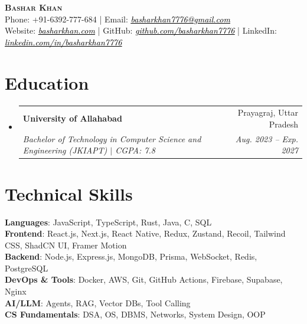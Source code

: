\documentclass[letterpaper,11pt]{article}
\makeatletter
\newcommand{\resumeSubheading}[4]{
  \item
    \begin{tabular*}{0.97\textwidth}[t]{l@{\extracolsep{\fill}}r}
      \textbf{#1} & #2 \\
      \textit{\small#3} & \textit{\small #4} \\
    \end{tabular*}
}
\newcommand{\resumeSubHeadingListStart}{\begin{itemize}[leftmargin=0.15in, label={}, topsep=1pt, itemsep=2pt, parsep=0pt]}
\newcommand{\resumeSubHeadingListEnd}{\end{itemize}}
\makeatother
\begin{document}
\begin{center}
    \textbf{\Huge \scshape Bashar Khan} \\[6pt]
    \small
    Phone: +91-6392-777-684 \enspace|\enspace
    Email: \href{mailto:basharkhan7776@gmail.com}{\textcolor{black}{\textit{\ul{basharkhan7776@gmail.com}}}} \\[2pt]
    Website: \href{https://www.basharkhan.com}{\textcolor{black}{\textit{\ul{basharkhan.com}}}} \enspace|\enspace
    GitHub: \href{https://github.com/basharkhan7776}{\textcolor{black}{\textit{\ul{github.com/basharkhan7776}}}} \enspace|\enspace
    LinkedIn: \href{https://linkedin.com/in/basharkhan7776}{\textcolor{black}{\textit{\ul{linkedin.com/in/basharkhan7776}}}}
\end{center}
\vspace{-8pt}


\section{Education}
  \resumeSubHeadingListStart
    \resumeSubheading
      {University of Allahabad}{Prayagraj, Uttar Pradesh}
      {Bachelor of Technology in Computer Science and Engineering (JKIAPT) $|$ CGPA: 7.8}{Aug. 2023 -- Exp. 2027}
  \resumeSubHeadingListEnd


\section{Technical Skills}
 \begin{itemize}[leftmargin=0.15in, label={}, topsep=1pt]
    \small{\item{
     \textbf{Languages}{: JavaScript, TypeScript, Rust, Java, C, SQL} \\
     \textbf{Frontend}{: React.js, Next.js, React Native, Redux, Zustand, Recoil, Tailwind CSS, ShadCN UI, Framer Motion} \\
     \textbf{Backend}{: Node.js, Express.js, MongoDB, Prisma, WebSocket, Redis, PostgreSQL} \\
     \textbf{DevOps \& Tools}{: Docker, AWS, Git, GitHub Actions, Firebase, Supabase, Nginx} \\
     \textbf{AI/LLM}{: Agents, RAG, Vector DBs, Tool Calling} \\
     \textbf{CS Fundamentals}{: DSA, OS, DBMS, Networks, System Design, OOP}
    }}
 \end{itemize}
\end{document}
